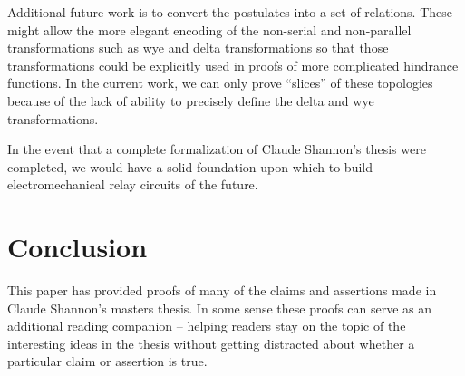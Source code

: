 \documentclass[11pt,twocolumn]{article}
\begin{document}
Additional future work is to convert the postulates into a set of
relations.  These might allow the more elegant encoding of the
non-serial and non-parallel transformations such as wye and delta
transformations so that those transformations could be explicitly used
in proofs of more complicated hindrance functions.  In the current
work, we can only prove ``slices'' of these topologies because of the
lack of ability to precisely define the delta and wye transformations.


In the event that a complete formalization of Claude Shannon's thesis
were completed, we would have a solid foundation upon which to build
electromechanical relay circuits of the future.


 

\section{Conclusion}




This paper has provided proofs of many of the claims and assertions
made in Claude Shannon's masters thesis.  In some sense these proofs
can serve as an additional reading companion -- helping readers stay
on the topic of the interesting ideas in the thesis without getting
distracted about whether a particular claim or assertion is true.


\begin{coqdoccode}
\coqdocemptyline
\end{coqdoccode}


 
\end{document}
